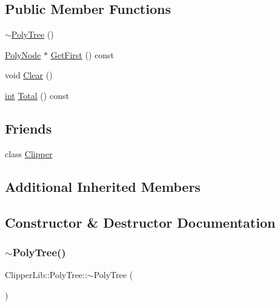 \subsection*{Public Member Functions}
\begin{DoxyCompactItemize}
\item 
\mbox{\hyperlink{class_clipper_lib_1_1_poly_tree_a32f033bcc4b5f80b180fc87a6ff4ecd8}{$\sim$\+Poly\+Tree}} ()
\item 
\mbox{\hyperlink{class_clipper_lib_1_1_poly_node}{Poly\+Node}} $\ast$ \mbox{\hyperlink{class_clipper_lib_1_1_poly_tree_a8b88b8d6225281ee7d536902b0d04e9e}{Get\+First}} () const
\item 
void \mbox{\hyperlink{class_clipper_lib_1_1_poly_tree_a8620ea631d478b3c43274ac084902ec4}{Clear}} ()
\item 
\mbox{\hyperlink{draw_8hh_aa620a13339ac3a1177c86edc549fda9b}{int}} \mbox{\hyperlink{class_clipper_lib_1_1_poly_tree_ad0d3c974bab5a30cc8c916da9fe14388}{Total}} () const
\end{DoxyCompactItemize}
\subsection*{Friends}
\begin{DoxyCompactItemize}
\item 
class \mbox{\hyperlink{class_clipper_lib_1_1_poly_tree_a4d39a09ecdddeeb85930dd4554a54b3c}{Clipper}}
\end{DoxyCompactItemize}
\subsection*{Additional Inherited Members}


\subsection{Constructor \& Destructor Documentation}
\mbox{\label{class_clipper_lib_1_1_poly_tree_a32f033bcc4b5f80b180fc87a6ff4ecd8}} 
\subsubsection{\texorpdfstring{$\sim$PolyTree()}{~PolyTree()}}
{\footnotesize\ttfamily Clipper\+Lib\+::\+Poly\+Tree\+::$\sim$\+Poly\+Tree (\begin{DoxyParamCaption}{ }\end{DoxyParamCaption})\hspace{0.3cm}{\ttfamily [inline]}}



